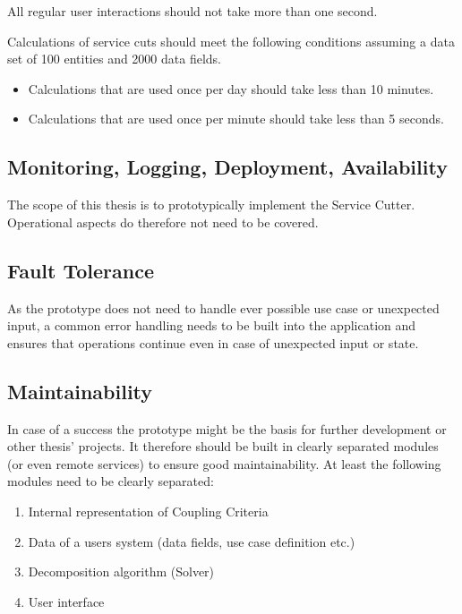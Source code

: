 All regular user interactions should not take more than one second.

Calculations of service cuts should meet the following conditions assuming a data set of 100 entities and 2000 data fields.

\begin{itemize}
\item Calculations that are used once per day should take less than 10 minutes.
\item Calculations that are used once per minute should take less than 5 seconds.
\end{itemize}

\subsection{Monitoring, Logging, Deployment, Availability}

The scope of this thesis is to prototypically implement the Service Cutter. Operational aspects do therefore not need to be covered. 

\subsection{Fault Tolerance}

As the prototype does not need to handle ever possible use case or unexpected input, a common error handling needs to be built into the application and ensures that operations continue even in case of unexpected input or state.

\subsection{Maintainability}

In case of a success the prototype might be the basis for further development or other thesis' projects. It therefore should be built in clearly separated modules (or even remote services) to ensure good maintainability. At least the following modules need to be clearly separated:


\begin{enumerate}
	\item Internal representation of Coupling Criteria
	\item Data of a users system (data fields, use case definition etc.) 
	\item Decomposition algorithm (Solver)
	\item User interface
\end{enumerate}


